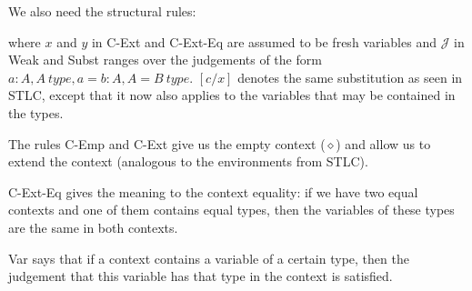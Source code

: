 We also need the structural rules:

\begin{definition}
where $x$ and $y$ in C-Ext and C-Ext-Eq are assumed to be fresh variables and
$\mathcal{J}$ in Weak and Subst ranges over the judgements of the form $a : A,
A~type, a = b: A, A = B~type$. $[c/x]$ denotes the same substitution as seen in
STLC, except that it now also applies to the variables that may be contained in
the types.
\end{definition}

The rules C-Emp and C-Ext give us the empty context ($\diamond$) and allow us
to extend the context (analogous to the environments from STLC).

C-Ext-Eq gives the meaning to the context equality: if we have two equal
contexts and one of them contains equal types, then the variables of these
types are the same in both contexts.

Var says that if a context contains a variable of a certain type, then the
judgement that this variable has that type in the context is satisfied.

